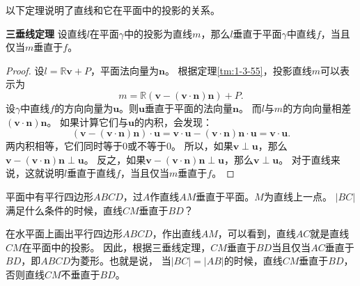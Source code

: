 \documentclass[12pt,UTF8]{ctexbook}
\begin{document}
以下定理说明了直线和它在平面中的投影的关系。
\begin{tm}{\textbf{三垂线定理}}\label{tm:1-3-57}
    设直线$l$在平面$\gamma$中的投影为直线$m$，那么$l$垂直于平面$\gamma$中直线$f$，当且仅当$m$垂直于$f$。
\end{tm}
\begin{proof}
    设$l=\mathbb{R}\mathbf{v}+P$，平面法向量为$\mathbf{n}$。
    根据定理\ref{tm:1-3-55}，投影直线$m$可以表示为
    $$m = \mathbb{R}(\mathbf{v} - (\mathbf{v}\cdot\mathbf{n})\mathbf{n}) + P.$$
    设$\gamma$中直线$f$的方向向量为$\mathbf{u}$。则$\mathbf{u}$垂直于平面的法向量$\mathbf{n}$。
    而$l$与$m$的方向向量相差$(\mathbf{v}\cdot\mathbf{n})\mathbf{n}$。
    如果计算它们与$\mathbf{u}$的内积，会发现：
    $$ (\mathbf{v} - (\mathbf{v}\cdot\mathbf{n})\mathbf{n})\cdot \mathbf{u} = \mathbf{v} \cdot \mathbf{u} - (\mathbf{v}\cdot\mathbf{n})\mathbf{n} \cdot \mathbf{u} = \mathbf{v} \cdot \mathbf{u}. $$
    两内积相等，它们同时等于$0$或不等于$0$。
    所以，如果$\mathbf{v} \perp \mathbf{u}$，那么$\mathbf{v} - (\mathbf{v}\cdot\mathbf{n})\mathbf{n} \perp \mathbf{u}$。
    反之，如果$\mathbf{v} - (\mathbf{v}\cdot\mathbf{n})\mathbf{n} \perp \mathbf{u}$，那么$\mathbf{v} \perp \mathbf{u}$。
    对于直线来说，这就说明$l$垂直于直线$f$，当且仅当$m$垂直于$f$。
\end{proof}

\begin{et}\label{et:1-3-10}
    平面中有平行四边形$ABCD$，过$A$作直线$AM$垂直于平面。$M$为直线上一点。
    $|BC|$满足什么条件的时候，直线$CM$垂直于$BD$？
\end{et}
\begin{so}
    在水平面上画出平行四边形$ABCD$，作出直线$AM$，可以看到，直线$AC$就是直线$CM$在平面中的投影。
    因此，根据三垂线定理，$CM$垂直于$BD$当且仅当$AC$垂直于$BD$，即$ABCD$为菱形。也就是说，
    当$|BC|=|AB|$的时候，直线$CM$垂直于$BD$，否则直线$CM$不垂直于$BD$。
\end{so}
\end{document}
